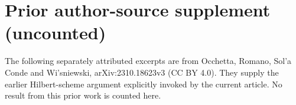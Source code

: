 \clearpage
\section*{Prior author-source supplement (uncounted)}
The following separately attributed excerpts are from Occhetta, Romano, Sol'a Conde and Wi'sniewski, arXiv:2310.18623v3 (CC BY 4.0). They supply the earlier Hilbert-scheme argument explicitly invoked by the current article. No result from this prior work is counted here.
\renewcommand{\theHsection}{wors6.\arabic{section}}
\renewcommand{\theHtheorem}{wors6.\arabic{section}.\arabic{theorem}}
\renewcommand{\theHequation}{wors6.\arabic{section}.\arabic{equation}}\renewcommand{\theequation}{\arabic{equation}}
\setcounter{section}{1}\setcounter{theorem}{0}\setcounter{equation}{1}
\begingroup\small
\endgroup
\setcounter{section}{2}\setcounter{subsection}{2}\setcounter{theorem}{5}\setcounter{equation}{2}
\setcounter{section}{4}\setcounter{theorem}{0}
\setcounter{theorem}{2}
\setcounter{section}{6}\setcounter{theorem}{3}\setcounter{equation}{13}
\setcounter{section}{7}\setcounter{theorem}{0}
\setcounter{theorem}{3}
